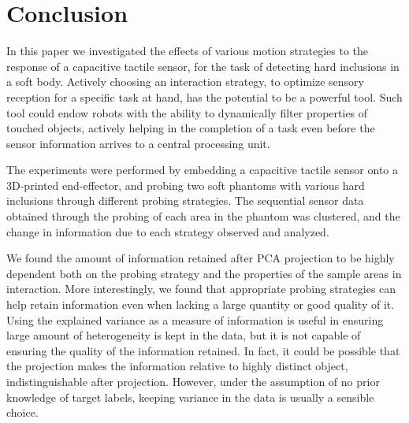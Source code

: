 \color{black}
\section{Conclusion} 	\label{sec_conclusion}

In this paper we investigated the effects of various motion strategies to the response of a capacitive 
tactile sensor, for the task of detecting hard inclusions in a soft body. 
Actively choosing an interaction strategy, to optimize sensory reception for a specific task at hand, has 
the potential to be a powerful tool. Such tool could endow robots with the ability to dynamically filter  
properties of touched objects, actively helping in the completion of a task \cite{olsson2004sensory, bohg2017interactive} 
even before the sensor information arrives to a central processing unit. 

The experiments were performed by embedding a capacitive tactile sensor onto a 3D-printed end-effector, 
and probing two soft phantoms with various hard inclusions through different probing strategies. 
The sequential sensor data obtained through the probing of each area in the phantom was clustered, 
and the change in information due to each strategy observed and analyzed. 

We found the amount of information retained after PCA projection to be highly dependent both on the 
probing strategy and the properties of the sample areas in interaction. More interestingly, 
we found that appropriate probing strategies can help retain information even when lacking a 
large quantity or good quality of it. 
Using the explained variance as a measure of information is useful in ensuring large amount of heterogeneity 
is kept in the data, but it is not capable of ensuring the quality of the information retained. In fact, 
it could be possible that the projection makes the information relative to highly distinct object, 
indistinguishable after projection. However, under the assumption of no prior knowledge of target labels, 
keeping variance in the data is usually a sensible choice.

